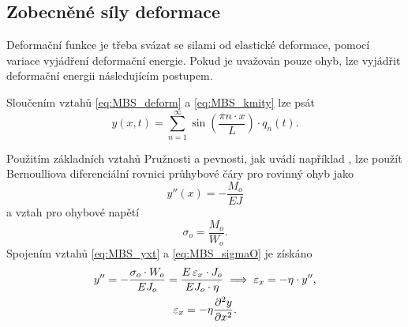 \subsection{Zobecněné síly deformace}
Deformační funkce je třeba svázat se silami od elastické deformace, pomocí variace vyjádření deformační energie. Pokud je uvažován pouze ohyb, lze vyjádřit deformační energii následujícím postupem. 

Sloučením vztahů \ref{eq:MBS_deform} a \ref{eq:MBS_kmity} lze psát
\begin{equation}\label{eq:MBS_yxt}
	y(x,t) = \sum_{n=1}^{\infty} \sin \left( \frac{\pi n \cdot x}{L}\right)  \cdot q_n(t).
\end{equation}

Použitím základních vztahů Pružnosti a pevnosti, jak uvádí například \cite{cite:PPI}, lze použít Bernoulliova diferenciální rovnici průhybové čáry pro rovinný ohyb jako
\begin{equation}\label{eq:MBS_Bernoulli}
	y''(x) = - \frac{M_o}{EJ}
\end{equation}
a vztah pro ohybové napětí 
\begin{equation}\label{eq:MBS_sigmaO}
	\sigma_o=\frac{M_o}{W_o}.
\end{equation}
Spojením vztahů \ref{eq:MBS_yxt} a \ref{eq:MBS_sigmaO} je získáno
\begin{gather}
	y'' = - \frac{\sigma_o \cdot W_o}{E J_{o}} = \frac{E \, \varepsilon_x \cdot  J_{o}}{E J_{o} \cdot \eta} \implies \varepsilon_x = - \eta \cdot y'' \notag ,\\
	\varepsilon_x = - \eta \frac{\partial^2 y }{\partial x^2}. \label{eq:MBS_y''}
\end{gather}

